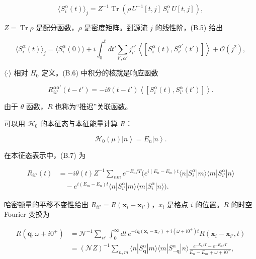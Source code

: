 \begin{equation*}
\langle S _ {i} ^ {\alpha} ( t ) \rangle_{j} = Z ^ {- 1} \operatorname{Tr} \left( \rho \, U ^ {- 1} [ t, j ] \, S _ {i} ^ {\alpha} \, U [ t, j ] \right) ,
\tag{B.5}
\end{equation*}

$Z = \operatorname{Tr}\rho$ 是配分函数，$\rho$ 是密度矩阵。到源流 $j$ 的线性阶，(B.5) 给出

\begin{equation*}
\langle S _ {i} ^ {\alpha} ( t ) \rangle_{j} = \langle S _ {i} ^ {\alpha} ( 0 ) \rangle + i \int_ {0} ^ {t} d t ' \sum_{i ', \alpha '} j_{i '} ^ {\alpha '} \left\langle \left[ S _ {i} ^ {\alpha} ( t ), S _ {i '} ^ {\alpha '} ( t ' ) \right] \right\rangle + \mathcal {O} ( j ^ {2} ) ,
\tag{B.6}
\end{equation*}

$\langle\cdot\rangle$ 相对 $H_{0}$ 定义。(B.6) 中积分的核就是响应函数

\begin{equation*}
R_{ii'} ^ {\alpha \alpha'} ( t - t ' ) = - i \theta ( t - t ' ) \left\langle \left[ S _ {i} ^ {\alpha} ( t ), S _ {i'} ^ {\alpha} ( t ' ) \right] \right\rangle .
\tag{B.7}
\end{equation*}

由于 $\theta$ 函数，$R$ 也称为“推迟”关联函数。

可以用 $\mathcal{H}_0$ 的本征态与本征能量计算 $R$：

\begin{equation*}
\mathcal {H} _ {0} ( \mu ) \left| n \right\rangle = E _ {n} \left| n \right\rangle .
\tag{B.8}
\end{equation*}

在本征态表示中，(B.7) 为

\begin{align*}
R_{ii'} ( t ) & = - i \theta ( t ) Z ^ {- 1} \sum_{nm} e ^ {- E_{n} /T} \Big( e ^ {i ( E_{n} - E_{m} ) t} \langle n | S _ {i} ^ {\alpha} | m \rangle \langle m | S _ {i'} ^ {\alpha} | n \rangle\\
& \quad - e ^ {i ( E_{m} - E_{n} ) t} \langle n | S _ {i'} ^ {\alpha} | m \rangle \langle m | S _ {i} ^ {\alpha} | n \rangle \Big) .
\tag{B.9}
\end{align*}

哈密顿量的平移不变性给出 $R_{ii'} = R(\mathbf{x}_i - \mathbf{x}_{i'})$，$x_i$ 是格点 $i$ 的位置。$R$ 的时空 Fourier 变换为

\begin{align*}
R ( \mathbf {q}, \omega + i0 ^ {+} ) & = \mathcal {N} ^ {- 1} \sum_{ii'} \int_ {0} ^ {\infty} d t \, e ^ {- i \mathbf {q} ( \mathbf {x} _ {i} - \mathbf {x} _ {i'} ) + i ( \omega + i0 ^ {+} ) t} R ( \mathbf {x} _ {i} - \mathbf {x} _ {i'}, t )\\
& = ( \mathcal {N} Z ) ^ {- 1} \sum_{n, m} \langle n | S _ {\mathbf {q}} ^ {\alpha} | m \rangle \langle m | S _ {- \mathbf {q}} ^ {\alpha} | n \rangle \frac {e ^ {- E_{n} /T} - e ^ {- E_{m} /T}}{E _ {n} - E _ {m} + \omega + i0 ^ {+}} ,
\tag{B.10}
\end{align*}

